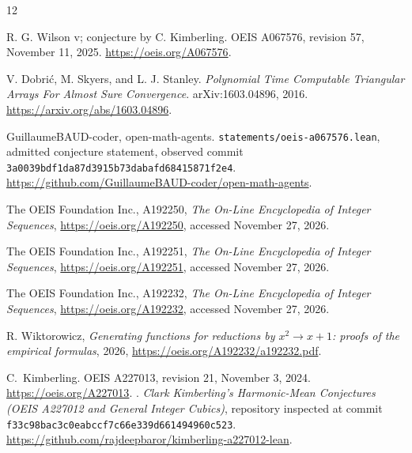 \documentclass[11pt]{article}
\begin{document}
\begin{thebibliography}{12}
\raggedright
{}
R. G. Wilson v; conjecture by C. Kimberling.
OEIS A067576, revision 57, November 11, 2025.
\url{https://oeis.org/A067576}.

V. Dobri\'c, M. Skyers, and L. J. Stanley.
\emph{Polynomial Time Computable Triangular Arrays For Almost Sure Convergence}.
arXiv:1603.04896, 2016.
\url{https://arxiv.org/abs/1603.04896}.

GuillaumeBAUD-coder, open-math-agents.
\texttt{statements/oeis-a067576.lean}, admitted conjecture statement,
observed commit \texttt{3a0039bdf1da87d3915b73dabafd68415871f2e4}.
\url{https://github.com/GuillaumeBAUD-coder/open-math-agents}.

The OEIS Foundation Inc., A192250,
\emph{The On-Line Encyclopedia of Integer Sequences},
\url{https://oeis.org/A192250}, accessed November 27, 2026.

The OEIS Foundation Inc., A192251,
\emph{The On-Line Encyclopedia of Integer Sequences},
\url{https://oeis.org/A192251}, accessed November 27, 2026.

The OEIS Foundation Inc., A192232,
\emph{The On-Line Encyclopedia of Integer Sequences},
\url{https://oeis.org/A192232}, accessed November 27, 2026.

R. Wiktorowicz,
\emph{Generating functions for reductions by $x^2\to x+1$: proofs of the empirical formulas},
2026, \url{https://oeis.org/A192232/a192232.pdf}.

 C.~Kimberling. OEIS A227013, revision 21, November 3, 2024.
\url{https://oeis.org/A227013}.
 . \emph{Clark Kimberling's Harmonic-Mean Conjectures (OEIS A227012 and General Integer Cubics)},
repository inspected at commit \texttt{f33c98bac3c0eabccf7c66e339d661494960c523}.
\url{https://github.com/rajdeepbaror/kimberling-a227012-lean}.

\end{thebibliography}
\end{document}
